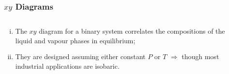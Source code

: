 \documentclass[10pt,compress,handout,ignorenonframetext,unknownkeysallowed]{beamer}
\begin{document}
\begin{frame}
  \frametitle{$xy$ Diagrams}
  \begin{columns}
     \begin{column}[l]{0.4\linewidth}
       \begin{enumerate}[i)]
          \item<1-> The $xy$ diagram for a binary system correlates the compositions of the liquid and vapour phases in equilibrium;
          \item<1-> They are designed assuming either constant $P$ or $T$ $\Longrightarrow$ though most industrial applications are isobaric.
       \end{enumerate}
     \end{column}
     \begin{column}[l]{0.6\linewidth}
     \end{column}
  \end{columns}
\end{frame}
\normalsize
\end{document}

